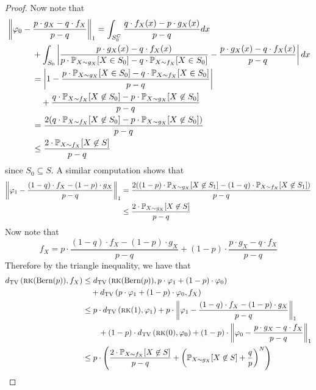 \begin{proof}
Now note that
\begin{align*}
&\left\| \varphi_0 - \frac{p \cdot g_X - q \cdot f_X}{p - q} \right\|_1 = \int_{S_0^C} \frac{q \cdot f_X(x) - p \cdot g_X(x)}{p - q} dx\\
&\quad \quad \quad+\int_{S_0} \left| \frac{p \cdot g_X(x) - q \cdot f_X(x)}{p \cdot \mathbb{P}_{X \sim g_X} [X \in S_0] - q \cdot \mathbb{P}_{X \sim f_X} [X \in S_0]} - \frac{p \cdot g_X(x) - q \cdot f_X(x)}{p - q} \right| dx \\
&\quad \quad \quad= \left| 1 - \frac{p \cdot \mathbb{P}_{X \sim g_X} [X \in S_0] - q \cdot \mathbb{P}_{X \sim f_X} [X \in S_0]}{p - q} \right| \\
&\quad\quad \quad \quad+ \frac{q \cdot \mathbb{P}_{X \sim f_X} [X \not \in S_0] - p \cdot \mathbb{P}_{X \sim g_X} [X \not \in S_0]}{p - q} \\
&\quad \quad \quad= \frac{2(q \cdot \mathbb{P}_{X \sim f_X} [X \not \in S_0] - p \cdot \mathbb{P}_{X \sim g_X} [X \not \in S_0])}{p - q} \\
&\quad \quad \quad\le \frac{2 \cdot \mathbb{P}_{X \sim f_X}[ X \not \in S]}{p - q}
\end{align*}
since $S_0 \subseteq S$. A similar computation shows that
\begin{align*}
\left\| \varphi_1 - \frac{(1 - q) \cdot f_X - (1 - p) \cdot g_X}{p - q} \right\|_1 &= \frac{2((1 - p) \cdot \mathbb{P}_{X \sim g_X} [X \not \in S_1] - (1 - q) \cdot \mathbb{P}_{X \sim f_X} [X \not \in S_1])}{p - q} \\
&\le \frac{2 \cdot \mathbb{P}_{X \sim g_X}[X \not \in S]}{p - q} \\
\end{align*}
Now note that
$$f_X = p \cdot \frac{(1 - q) \cdot f_X - (1 - p) \cdot g_X}{p - q} + (1 - p) \cdot \frac{p \cdot g_X - q \cdot f_X}{p - q}$$
Therefore by the triangle inequality, we have that
\begin{align*}
\TV\left( \textsc{rk}(\text{Bern}(p)), f_X \right) &\le \TV\left( \textsc{rk}(\text{Bern}(p)), p \cdot \varphi_1 + (1 - p) \cdot \varphi_0 \right) \\
&\quad+ \TV\left( p \cdot \varphi_1 + (1 - p) \cdot \varphi_0, f_X \right) \\
&\le p \cdot \TV\left( \textsc{rk}(1), \varphi_1\right) + p \cdot \left\| \varphi_1 - \frac{(1 - q) \cdot f_X - (1 - p) \cdot g_X}{p - q} \right\|_1 \\
&\quad \quad + (1 - p) \cdot \TV\left( \textsc{rk}(0), \varphi_0 \right) + (1 - p) \cdot \left\| \varphi_0 - \frac{p \cdot g_X - q \cdot f_X}{p - q} \right\|_1 \\
&\le p \cdot \left( \frac{2 \cdot \bP_{X \sim f_X} [X \not \in S]}{p - q} + \left( \bP_{X \sim g_X}[X \not \in S] + \frac{q}{p} \right)^{N} \right) \\

\end{align*}
\end{proof}
